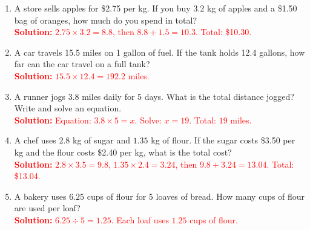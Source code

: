 \documentclass[11pt]{article}
\begin{document}
\vspace{1em}

\begin{tcolorbox}[colframe=black!60, colback=white, 
coltitle=black, colbacktitle=black!15, fonttitle=\bfseries\Large, 
title=Problems, halign title=center, left=10pt, right=10pt, top=10pt, bottom=100pt]
\begin{enumerate}[start=9, itemsep=7em]
    \item A store sells apples for \$2.75 per kg. If you buy 3.2 kg of apples and a \$1.50 bag of oranges, how much do you spend in total?\\
    \textcolor{red}{\textbf{Solution:} \( 2.75 \times 3.2 = 8.8 \), then \( 8.8 + 1.5 = 10.3 \). Total: \$10.30.}

    \item A car travels 15.5 miles on 1 gallon of fuel. If the tank holds 12.4 gallons, how far can the car travel on a full tank?\\
    \textcolor{red}{\textbf{Solution:} \( 15.5 \times 12.4 = 192.2 \) miles.}

    \item A runner jogs \( 3.8 \) miles daily for \( 5 \) days. What is the total distance jogged? Write and solve an equation.\\
    \textcolor{red}{\textbf{Solution:} Equation: \( 3.8 \times 5 = x \). Solve: \( x = 19 \). Total: \( 19 \) miles.}

    \item A chef uses \( 2.8 \) kg of sugar and \( 1.35 \) kg of flour. If the sugar costs \$3.50 per kg and the flour costs \$2.40 per kg, what is the total cost?\\
    \textcolor{red}{\textbf{Solution:} \( 2.8 \times 3.5 = 9.8 \), \( 1.35 \times 2.4 = 3.24 \), then \( 9.8 + 3.24 = 13.04 \). Total: \$13.04.}

    \item A bakery uses \( 6.25 \) cups of flour for 5 loaves of bread. How many cups of flour are used per loaf?\\
    \textcolor{red}{\textbf{Solution:} \( 6.25 \div 5 = 1.25 \). Each loaf uses \( 1.25 \) cups of flour.}
\end{enumerate}
\end{tcolorbox}

\vspace{1em}
\end{document}
